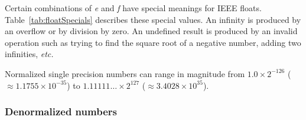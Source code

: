 Certain combinations of \emph{e} and \emph{f} have special meanings for
IEEE floats. Table~\ref{tab:floatSpecials} describes these special values.
An infinity is produced by an overflow or by division by zero. An undefined
result is produced by an invalid operation such as trying to find the
square root of a negative number, adding two infinities, \emph{etc.}

Normalized single precision numbers can range in magnitude from 
$1.0 \times 2^{-126}$ ($\approx 1.1755 \times 10^{-35}$) to 
$1.11111\ldots \times 2^{127}$ ($\approx 3.4028 \times 10^{35}$).

\subsubsection{Denormalized numbers}

